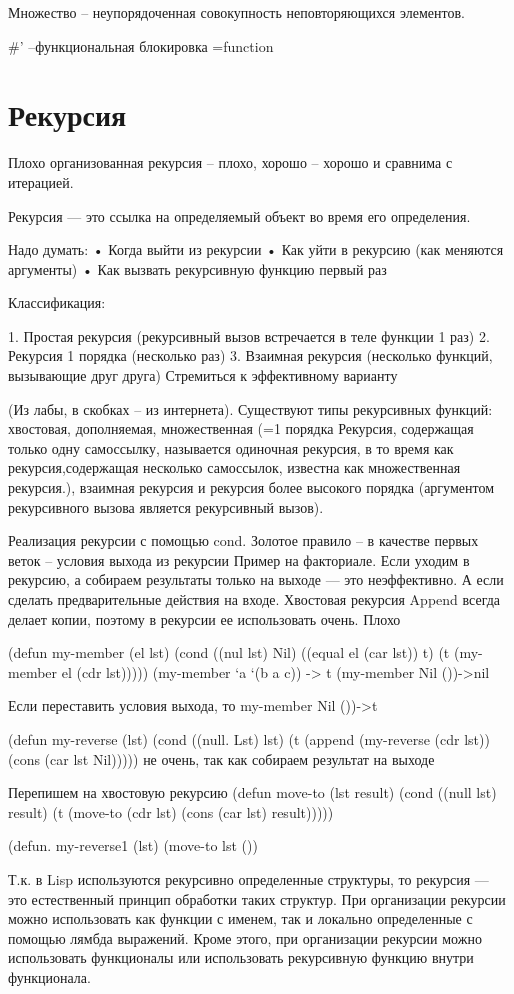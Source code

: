 \documentclass[12pt]{report}
\begin{document}
Множество -- неупорядоченная совокупность неповторяющихся элементов.

\#' --функциональная блокировка =function




\section*{Рекурсия}

Плохо организованная рекурсия – плохо, хорошо – хорошо и сравнима с итерацией.


Рекурсия — это ссылка на определяемый объект во время его определения. 




Надо думать:
•	Когда выйти из рекурсии
•	Как уйти в рекурсию (как меняются аргументы)
•	Как вызвать рекурсивную функцию первый раз


Классификация:

1.	Простая рекурсия (рекурсивный вызов встречается в теле функции 1 раз)
2.	Рекурсия 1 порядка (несколько раз)
3.	Взаимная рекурсия (несколько функций, вызывающие друг друга)
Стремиться к эффективному варианту

(Из лабы, в скобках -- из интернета). Существуют типы рекурсивных функций: хвостовая, дополняемая, множественная (=1 порядка Рекурсия, содержащая только одну самоссылку, называется одиночная рекурсия, в то время как рекурсия,содержащая несколько самоссылок, известна как множественная рекурсия.), взаимная рекурсия и рекурсия более высокого порядка (аргументом рекурсивного вызова является рекурсивный вызов).

Реализация рекурсии с помощью cond. 
Золотое правило – в качестве первых веток – условия выхода из рекурсии
Пример на факториале.
Если уходим в рекурсию, а собираем результаты только на выходе — это неэффективно. А если сделать предварительные действия на входе. Хвостовая рекурсия
Append всегда делает копии, поэтому в рекурсии ее использовать очень. Плохо

(defun my-member (el lst)
(cond ((nul lst) Nil)
((equal el (car lst)) t)
(t (my-member el (cdr lst)))))
(my-member ‘a ‘(b a c)) -> t
(my-member Nil ())->nil

Если переставить условия выхода, то my-member Nil ())->t

(defun my-reverse (lst)
(cond ((null. Lst) lst)
(t (append (my-reverse (cdr lst)) (cons (car lst Nil))))) 
не очень, так как собираем результат на выходе

Перепишем на хвостовую рекурсию
(defun move-to (lst result)
(cond ((null lst) result)
(t (move-to (cdr lst) (cons (car lst) result)))))

(defun. my-reverse1 (lst)
(move-to lst ())

Т.к. в Lisp используются рекурсивно определенные структуры, то рекурсия — это естественный принцип обработки таких структур. При организации рекурсии можно использовать как функции с именем, так и локально определенные с помощью лямбда выражений. Кроме этого, при организации рекурсии можно использовать функционалы или использовать рекурсивную функцию внутри функционала.
\end{document}
